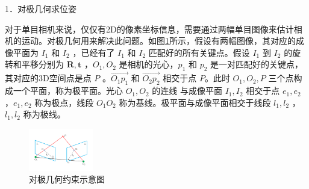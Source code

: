 1．对极几何求位姿

对于单目相机来说，仅仅有2D的像素坐标信息，需要通过两幅单目图像来估计相机的运动。对极几何用来解决此问题。如图\ref{fig3_8}所示，假设有两幅图像，其对应的成像平面为 $I_1 $ 和 $I_2$ ，已经有了  $I_1 $ 和 $I_2$  匹配好的所有关键点。假设 $I_1 $ 到 $I_2$ 的旋转和平移分别为 $\boldsymbol{R}, \boldsymbol{t} $ ，$O_{1}, O_{2} $ 是相机的光心，$p_1 $  和 $p_2 $ 是一对匹配好的关键点，其对应的3D空间点是点 $P$ 。$\overrightarrow{O_{1} p_{1}} $ 和 $\overrightarrow{O_{2} p_{2}} $ 相交于点 $P$。此时 $O_{1}, O_{2}, P $ 三个点构成一个平面，称为极平面。光心 $O_{1}, O_{2} $ 的连线 与成像平面 $I_1,I_2 $ 相交于点 $e_1,e_2 $ ，$e_1,e_2 $ 称为极点，线段 $O_1O_2 $ 称为基线。极平面与成像平面相交于线段 $l_1,l_2 $ ， $l_1,l_2 $ 称为极线。
\begin{figure}[h]\setlength{\belowcaptionskip}{-12pt}
	\centering
	\includegraphics[width=0.25\textwidth, angle=-90]{figures/chapter3/fig3_8}
	\caption{对极几何约束示意图}\label{fig3_8}
\end{figure}


